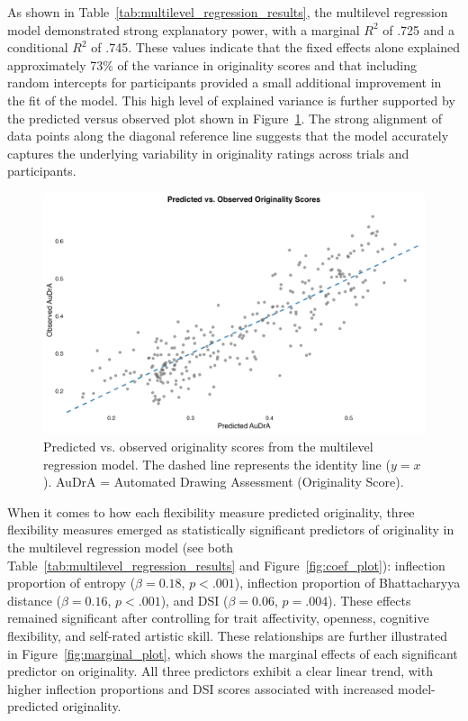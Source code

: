 \documentclass[../MA_Thesis.tex]{subfiles}
\begin{document}
As shown in Table~\ref{tab:multilevel_regression_results}, the multilevel regression model demonstrated strong explanatory power, with a marginal $R^2$ of .725 and a conditional $R^2$ of .745. These values indicate that the fixed effects alone explained approximately 73\% of the variance in originality scores and that including random intercepts for participants provided a small additional improvement in the fit of the model. This high level of explained variance is further supported by the predicted versus observed plot shown in Figure~\ref{fig:predicted_vs_observed}. The strong alignment of data points along the diagonal reference line suggests that the model accurately captures the underlying variability in originality ratings across trials and participants.

\begin{figure}[H]
  \centering
  \includegraphics[width=\textwidth]{../analysis/results/main_results/multilevel_regression/predicted_vs_observed_plot.png}
  \caption{Predicted vs. observed originality scores from the multilevel regression model. The dashed line represents the identity line ($y = x$). AuDrA = Automated Drawing Assessment (Originality Score).}
  \label{fig:predicted_vs_observed}
\end{figure}

When it comes to how each flexibility measure predicted originality, three flexibility measures emerged as statistically significant predictors of originality in the multilevel regression model (see both Table~\ref{tab:multilevel_regression_results} and  Figure~\ref{fig:coef_plot}): inflection proportion of entropy ($\beta = 0.18$, $p < .001$), inflection proportion of Bhattacharyya distance ($\beta = 0.16$, $p < .001$), and DSI ($\beta = 0.06$, $p = .004$). These effects remained significant after controlling for trait affectivity, openness, cognitive flexibility, and self-rated artistic skill. These relationships are further illustrated in Figure~\ref{fig:marginal_plot}, which shows the marginal effects of each significant predictor on originality. All three predictors exhibit a clear linear trend, with higher inflection proportions and DSI scores associated with increased model-predicted originality. 
\end{document}
